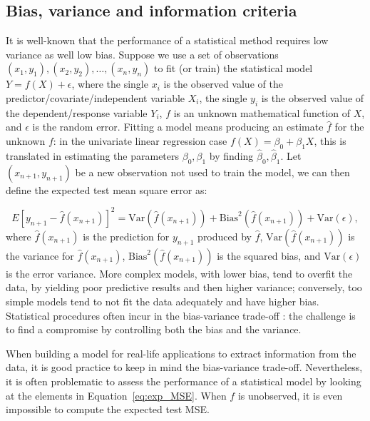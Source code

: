 \documentclass{statsoc}
\begin{document}
\subsection{Bias, variance and information criteria}

It is well-known that the performance of a statistical method requires low variance as well low bias. Suppose we use a set of observations $(x_1,y_1),(x_2,y_2),\ldots,(x_n,y_n)$ to fit (or train) the statistical model $Y=f(X)+\epsilon$, where the single $x_i$ is the observed value of the predictor/covariate/independent variable $X_i$, the single $y_i$ is the observed value of the  dependent/response variable $Y_i$, $f$ is an unknown mathematical function of $X$, and $\epsilon$ is the random error. Fitting a model means producing an estimate $\hat{f}$ for the unknown $f$: in the univariate linear regression case $f(X)= \beta_0+\beta_1X$, this is translated in estimating the parameters $\beta_0,\beta_1$ by finding $\hat{\beta}_0, \hat{\beta}_1$.
Let  $(x_{n+1}, y_{n+1})$ be a new observation not used to train the model, we can then define the expected test mean square error as:

\begin{equation}
E \left[ y_{n+1}-\hat{f}({x}_{n+1}) \right]^2 = \text{Var}(\hat{f}({x}_{n+1}))+ \text{Bias}^2(\hat{f}({x}_{n+1}))+\text{Var}(\epsilon),
\label{eq:exp_MSE}
\end{equation}
%
where $\hat{f}(x_{n+1})$ is the prediction for $y_{n+1}$ produced by $\hat{f}$, $\text{Var}(\hat{f}(x_{n+1}))$ is the variance for $\hat{f}(x_{n+1})$, $\text{Bias}^2(\hat{f}(x_{n+1}))$ is the squared bias, and $\text{Var}(\epsilon)$ is the error variance.
More complex models, with lower bias, tend to overfit the data, by yielding  poor  predictive results and then higher variance; conversely, too simple models tend to not fit the data adequately and have higher bias. Statistical procedures often incur in the bias-variance 
trade-off \citep{james2013introduction}: the challenge is to find a compromise by controlling both the bias and the variance.

When building a model for real-life applications to extract information from the data, it is good practice to keep in mind the bias-variance trade-off. Nevertheless, it is often 
problematic to assess the performance of a statistical model by looking at the elements in Equation~\eqref{eq:exp_MSE}. When $f$ is unobserved, it is even impossible to compute the expected test MSE.
\end{document}
